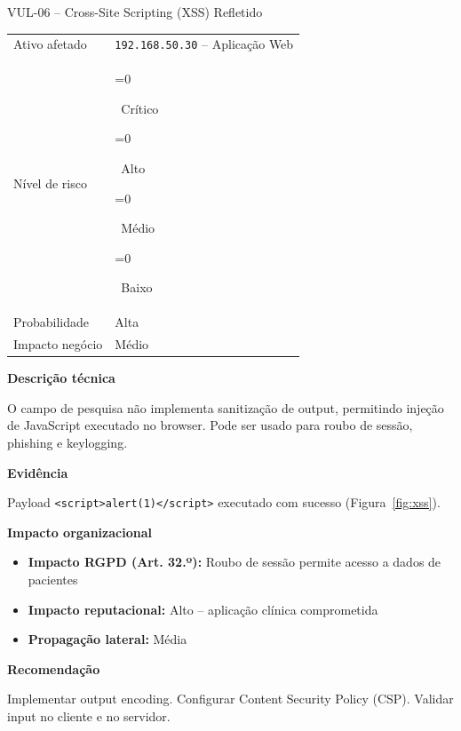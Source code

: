 \documentclass[12pt, a4paper]{report}
\newcommand{\risk}[1]{%
  \ifnum\pdfstrcmp{#1}{Critico}=0{\colorbox{Critical}{\color{white}\bfseries\footnotesize\strut~Crítico~}}\fi
  \ifnum\pdfstrcmp{#1}{Alto}=0{\colorbox{High}{\color{white}\bfseries\footnotesize\strut~Alto~}}\fi
  \ifnum\pdfstrcmp{#1}{Medio}=0{\colorbox{Medium}{\color{black}\bfseries\footnotesize\strut~Médio~}}\fi
  \ifnum\pdfstrcmp{#1}{Baixo}=0{\colorbox{Low}{\color{white}\bfseries\footnotesize\strut~Baixo~}}\fi}
\begin{document}
\begin{finding}{VUL-06 -- Cross-Site Scripting (XSS) Refletido}
\begin{tabular}{@{}ll@{}}
  \small\color{TextGray}Ativo afetado   & \texttt{192.168.50.30} -- Aplicação Web \\[3pt]
  \small\color{TextGray}Nível de risco  & \risk{Alto} \\[3pt]
  \small\color{TextGray}Probabilidade   & Alta \\[3pt]
  \small\color{TextGray}Impacto negócio & Médio \\
\end{tabular}

\vspace{8pt}\textbf{Descrição técnica}

O campo de pesquisa não implementa sanitização de output, permitindo injeção de JavaScript
executado no browser. Pode ser usado para roubo de sessão, phishing e keylogging.

\vspace{6pt}\textbf{Evidência}

Payload \texttt{<script>alert(1)</script>} executado com sucesso (Figura~\ref{fig:xss}).

\vspace{4pt}\textbf{Impacto organizacional}
\begin{itemize}[itemsep=1pt]
  \item \textbf{Impacto RGPD (Art. 32.º):} Roubo de sessão permite acesso a dados de pacientes
  \item \textbf{Impacto reputacional:} Alto -- aplicação clínica comprometida
  \item \textbf{Propagação lateral:} Média
\end{itemize}

\vspace{4pt}\textbf{Recomendação}

Implementar output encoding. Configurar Content Security Policy (CSP). Validar input no
cliente e no servidor.
\end{finding}

\vspace{0.8em}
\end{document}
